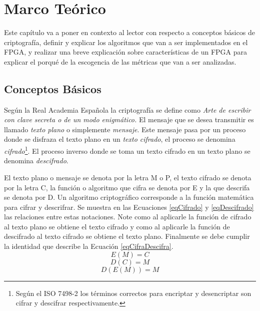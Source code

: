 \chapter{Marco Teórico}

Este capítulo va a poner en contexto al lector con respecto a conceptos básicos de criptografía, definir y explicar los algoritmos que van a ser implementados en el FPGA, y realizar una breve explicación sobre características de un FPGA para explicar el porqué de la escogencia de las métricas que van a ser analizadas.

\section{Conceptos Básicos}
Según la Real Academia Española \cite{bruce} la criptografía se define como 
\newline
\newline
\emph{Arte de escribir con clave secreta o de un modo enigmático.}
\newline
\newline
El mensaje que se desea transmitir es llamado \textit{texto plano} o simplemente \textit{mensaje}. Este mensaje pasa por un proceso donde se disfraza el texto plano en un \textit{texto cifrado}, el proceso se denomina \textit{cifrado}\footnote{Según el ISO 7498-2 los términos correctos para encriptar y desencriptar son cifrar y descifrar respectivamente.}. El proceso inverso donde se toma un texto cifrado en un texto plano se denomina \textit{descifrado}. 

El texto plano o mensaje se denota por la letra M o P, el texto cifrado se denota por la letra C, la función o algoritmo que cifra se denota por E y la que descrifa se denota por D. Un algoritmo criptográfico corresponde a la función matemática para cifrar y descrifrar.
\newline
Se muestra en las Ecuaciones \eqref{eqCifrado} y \eqref{eqDescifrado} las relaciones entre estas notaciones. Note como al aplicarle la función de cifrado al texto plano se obtiene el texto cifrado y como al aplicarle la función de descifrado al texto cifrado se obtiene el texto plano. Finalmente se debe cumplir la identidad que describe la Ecuación \eqref{eqCifraDescifra}. \cite{bruce}
\begin{equation} \label{eqCifrado}
E(M) = C
\end{equation}
\begin{equation} \label{eqDescifrado}
D(C) = M
\end{equation}
\begin{equation} \label{eqCifraDescifra}
D(E(M)) = M
\end{equation}


